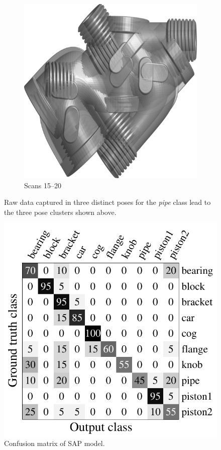\begin{figure}[ht]
\begin{subfigure}[b]{0.30\linewidth}
		\includegraphics[width=\linewidth]{fig/3dreg/cluster3.png}
		\caption{Scans 15--20}
	\end{subfigure}
	\caption{Raw data captured in three distinct poses for the \emph{pipe} class lead to the three pose clusters shown above.}
	\label{fig:3dclusters}
\end{figure}

\begin{figure}[ht]
	\centering 
	\includegraphics[width=0.4\linewidth]{fig/3dreg/confusion_sap.pdf}
	\caption{Confusion matrix of SAP model.}
	\label{fig:confusion_sap}
\end{figure}

